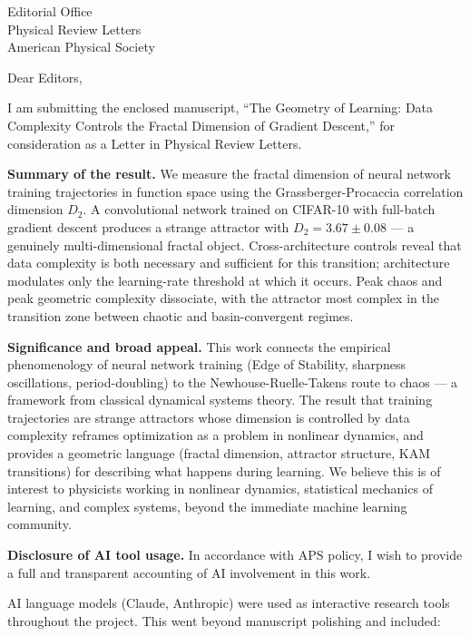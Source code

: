 \documentclass[11pt]{letter}
\begin{document}
\begin{letter}{%
Editorial Office\\
Physical Review Letters\\
American Physical Society}

\opening{Dear Editors,}

I am submitting the enclosed manuscript, ``The Geometry of Learning: Data Complexity Controls the Fractal Dimension of Gradient Descent,'' for consideration as a Letter in Physical Review Letters.

\textbf{Summary of the result.} We measure the fractal dimension of neural network training trajectories in function space using the Grassberger-Procaccia correlation dimension $D_2$. A convolutional network trained on CIFAR-10 with full-batch gradient descent produces a strange attractor with $D_2 = 3.67 \pm 0.08$ --- a genuinely multi-dimensional fractal object. Cross-architecture controls reveal that data complexity is both necessary and sufficient for this transition; architecture modulates only the learning-rate threshold at which it occurs. Peak chaos and peak geometric complexity dissociate, with the attractor most complex in the transition zone between chaotic and basin-convergent regimes.

\textbf{Significance and broad appeal.} This work connects the empirical phenomenology of neural network training (Edge of Stability, sharpness oscillations, period-doubling) to the Newhouse-Ruelle-Takens route to chaos --- a framework from classical dynamical systems theory. The result that training trajectories are strange attractors whose dimension is controlled by data complexity reframes optimization as a problem in nonlinear dynamics, and provides a geometric language (fractal dimension, attractor structure, KAM transitions) for describing what happens during learning. We believe this is of interest to physicists working in nonlinear dynamics, statistical mechanics of learning, and complex systems, beyond the immediate machine learning community.

\textbf{Disclosure of AI tool usage.} In accordance with APS policy, I wish to provide a full and transparent accounting of AI involvement in this work.

AI language models (Claude, Anthropic) were used as interactive research tools throughout the project. This went beyond manuscript polishing and included:


\end{letter}
\end{document}
